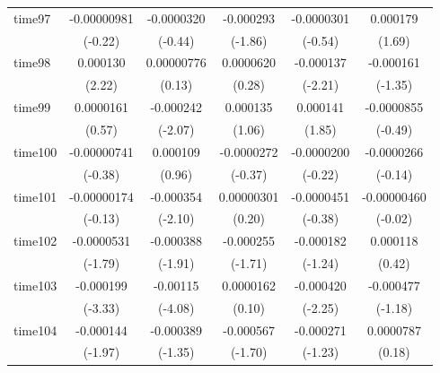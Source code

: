 \begin{table}[htbp]
\begin{tabular}{l*{5}{c}}
time97      & -0.00000981         &  -0.0000320         &   -0.000293         &  -0.0000301         &    0.000179         \\
            &     (-0.22)         &     (-0.44)         &     (-1.86)         &     (-0.54)         &      (1.69)         \\
time98      &    0.000130\sym{*}  &  0.00000776         &   0.0000620         &   -0.000137\sym{*}  &   -0.000161         \\
            &      (2.22)         &      (0.13)         &      (0.28)         &     (-2.21)         &     (-1.35)         \\
time99      &   0.0000161         &   -0.000242\sym{*}  &    0.000135         &    0.000141         &  -0.0000855         \\
            &      (0.57)         &     (-2.07)         &      (1.06)         &      (1.85)         &     (-0.49)         \\
time100     & -0.00000741         &    0.000109         &  -0.0000272         &  -0.0000200         &  -0.0000266         \\
            &     (-0.38)         &      (0.96)         &     (-0.37)         &     (-0.22)         &     (-0.14)         \\
time101     & -0.00000174         &   -0.000354\sym{*}  &  0.00000301         &  -0.0000451         & -0.00000460         \\
            &     (-0.13)         &     (-2.10)         &      (0.20)         &     (-0.38)         &     (-0.02)         \\
time102     &  -0.0000531         &   -0.000388         &   -0.000255         &   -0.000182         &    0.000118         \\
            &     (-1.79)         &     (-1.91)         &     (-1.71)         &     (-1.24)         &      (0.42)         \\
time103     &   -0.000199\sym{***}&    -0.00115\sym{***}&   0.0000162         &   -0.000420\sym{*}  &   -0.000477         \\
            &     (-3.33)         &     (-4.08)         &      (0.10)         &     (-2.25)         &     (-1.18)         \\
time104     &   -0.000144\sym{*}  &   -0.000389         &   -0.000567         &   -0.000271         &   0.0000787         \\
            &     (-1.97)         &     (-1.35)         &     (-1.70)         &     (-1.23)         &      (0.18)         \\

\end{tabular}
\end{table}
